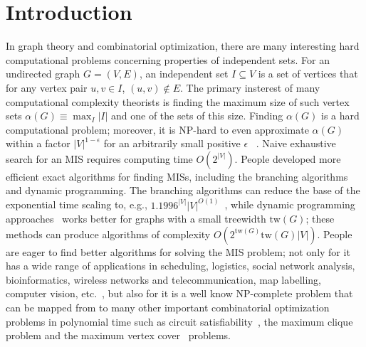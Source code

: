 \documentclass[onefignum, onetabnum]{siamart190516}
\newcommand{\<}{\langle}
\renewcommand{\>}{\rangle}
\begin{document}
\section{Introduction}
In graph theory and combinatorial optimization, there are many interesting hard computational problems concerning properties of independent sets.
For an undirected graph $G = (V,E)$, an independent set $I \subseteq V$ is a set of vertices that for any vertex pair $u,v \in I$, $(u, v) \not\in E$. %
The primary insterest of many computational complexity theorists is finding the maximum size of such vertex sets $\alpha(G) \equiv \max_{I}|I|$ and one of the sets of this size.
Finding $\alpha(G)$ is a hard computational problem; moreover, it is NP-hard to even approximate $\alpha(G)$ within a factor $|V|^{1-\epsilon}$ for an arbitrarily small positive $\epsilon$ ~\cite{Hastad1996}.
Naive exhaustive search for an MIS requires computing time $O\left(2^{|V|} \right)$.
People developed more efficient exact algorithms for finding MISs, including the branching algorithms~\cite{Tarjan1977,Robson1986} and dynamic programming.
The branching algorithms can reduce the base of the exponential time scaling to, e.g., $1.1996^{|V|} {|V|}^{O(1)}$~\cite{Xiao2017}, 
while dynamic programming approaches~\cite{Courcelle1990, Fomin2013} works better for graphs with a small treewidth $\text{tw}(G)$;
these methods can produce algorithms of complexity $O(2^{\text{tw}(G)} \text{tw}(G) |V|)$.
People are eager to find better algorithms for solving the MIS problem;
not only for it has a wide range of applications in scheduling, logistics, social network analysis, bioinformatics, wireless networks and telecommunication,
map labelling, computer vision, etc.~\cite{Butenko2003, Wu2015}, but also for it is a well know NP-complete problem that can be mapped from
 to many other important combinatorial optimization problems in polynomial time such as circuit satisfiability~\cite{}, the maximum clique problem and the maximum vertex cover~\cite{Moore2011} problems.
\end{document}
